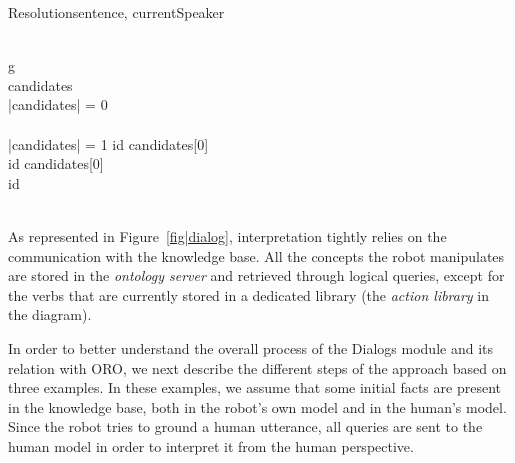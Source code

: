 \documentclass[twocolumn]{svjour3}
\begin{document}
\small
\begin{pseudocode}[ruled]{Resolution}{sentence, currentSpeaker}
\label{algo|Resolution}

 \GETS {} \\

\FOREACH g \in {} \DO 
\BEGIN
    \GETS {} \\
   candidates \GETS {} \\
   
   \IF \left|{candidates}\right| = 0 \THEN
    \BEGIN
       \\
      \EXIT \\
    \END
   \ELSEIF \left|{candidates}\right| = 1 \THEN
      id \GETS candidates[0]\\

   \ELSE
      \BEGIN
	\IF {} \THEN
	  id \GETS candidates[0] \\
	\ELSE
	  id \GETS {} \\
      \END \\
\END
\end{pseudocode}
\normalsize

As represented in Figure~\ref{fig|dialog}, interpretation tightly relies on the
communication with the knowledge base. All the concepts the robot manipulates
are stored in the \textit{ontology server} and retrieved through logical
queries, except for the verbs that are currently stored in a dedicated library
(the \emph{action library} in the diagram).



In order to better understand the overall process of the {\sc Dialogs} module and its relation with ORO, we next describe the different steps of the approach based on three examples. In these examples, we
assume that some initial facts are present in the knowledge base, both in the
robot's own model and in the human's model.  Since the robot tries to ground a
human utterance, all queries are sent to the human model in order to interpret
it from the human perspective. 
\end{document}
